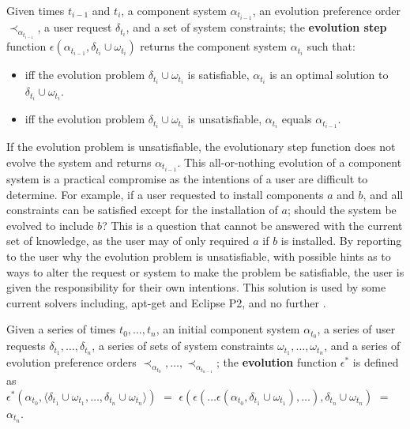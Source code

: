 \begin{defs}
Given times $t_{i-1}$ and $t_i$, a component system $\alpha_{t_{i-1}}$, an evolution preference order $\prec_{\alpha_{t_{i-1}}}$, 
a user request $\delta_{t_i}$, and a set of system constraints;
the \textbf{evolution step} function  $\epsilon(\alpha_{t_{i-1}},\delta_{t_i} \cup \omega_{t_i})$ returns the component system $\alpha_{t_i}$ such that:
\begin{itemize}
  \item iff the evolution problem $\delta_{t_i} \cup \omega_{t_i}$ is satisfiable, $\alpha_{t_i}$ is an optimal solution to $\delta_{t_i} \cup \omega_{t_i}$.
  \item iff the evolution problem $\delta_{t_i} \cup \omega_{t_i}$ is unsatisfiable, $\alpha_{t_i}$ equals $\alpha_{t_{i-1}}$.
\end{itemize}
\end{defs}
If the evolution problem is unsatisfiable, the evolutionary step function does not evolve the system and returns $\alpha_{t_{i-1}}$.
This all-or-nothing evolution of a component system is a practical compromise as the intentions of a user are difficult to determine.
For example, if a user requested to install components $a$ and $b$, and all constraints can be satisfied except for the installation of $a$; should the system be evolved to include $b$?
This is a question that cannot be answered with the current set of knowledge, as the user may of only required $a$ if $b$ is installed.
By reporting to the user why the evolution problem is unsatisfiable, with possible hints as to ways to alter the request or system to make the problem be satisfiable,
the user is given the responsibility for their own intentions.
This solution is used by some current solvers including, apt-get and Eclipse P2, and no further . 

\begin{defs}
Given a series of times $t_0,\ldots,t_n$, an initial component system $\alpha_{t_0}$, 
a series of user requests $\delta_{t_1},\ldots,\delta_{t_n}$, a series of sets of system constraints $\omega_{t_1},\ldots,\omega_{t_n}$,
and a series of evolution preference orders $\prec_{\alpha_{t_0}},\ldots, \prec_{\alpha_{t_{n-1}}}$;
the \textbf{evolution} function $\epsilon^*$ is defined as\\
$\epsilon^*(\alpha_{t_0},\langle \delta_{t_1} \cup \omega_{t_1},\ldots,\delta_{t_n} \cup \omega_{t_n} \rangle)$ $=$ $\epsilon(\epsilon(\ldots \epsilon(\alpha_{t_0},\delta_{t_1} \cup \omega_{t_1}),\ldots),\delta_{t_n} \cup \omega_{t_n})$
$=$ $\alpha_{t_n}$.
\end{defs}

